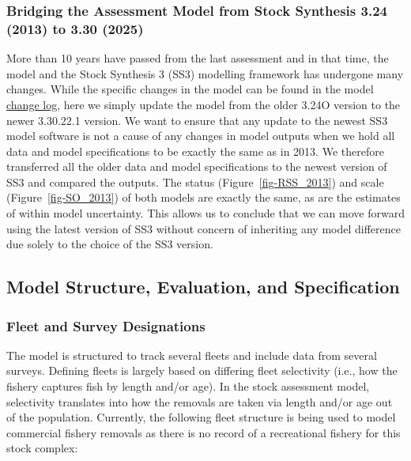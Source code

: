 \documentclass[
]{scrartcl}
\begin{document}
\subsubsection{Bridging the Assessment Model from Stock Synthesis 3.24
(2013) to 3.30
(2025)}\label{bridging-the-assessment-model-from-stock-synthesis-3.24-2013-to-3.30-2025}

More than 10 years have passed from the last assessment and in that
time, the model and the Stock Synthesis 3 (SS3) modelling framework has
undergone many changes. While the specific changes in the model can be
found in the model
\href{https://github.com/orgs/nmfs-ost/projects/11}{change log}, here we
simply update the model from the older 3.24O version to the newer
3.30.22.1 version. We want to ensure that any update to the newest SS3
model software is not a cause of any changes in model outputs when we
hold all data and model specifications to be exactly the same as in
2013. We therefore transferred all the older data and model
specifications to the newest version of SS3 and compared the outputs.
The status (Figure~\ref{fig-RSS_2013}) and scale
(Figure~\ref{fig-SO_2013}) of both models are exactly the same, as are
the estimates of within model uncertainty. This allows us to conclude
that we can move forward using the latest version of SS3 without concern
of inheriting any model difference due solely to the choice of the SS3
version.

\subsection{Model Structure, Evaluation, and
Specification}\label{model-structure-evaluation-and-specification}

\subsubsection{Fleet and Survey
Designations}\label{fleet-and-survey-designations}

The model is structured to track several fleets and include data from
several surveys. Defining fleets is largely based on differing fleet
selectivity (i.e., how the fishery captures fish by length and/or age).
In the stock assessment model, selectivity translates into how the
removals are taken via length and/or age out of the population.
Currently, the following fleet structure is being used to model
commercial fishery removals as there is no record of a recreational
fishery for this stock complex:
\end{document}
